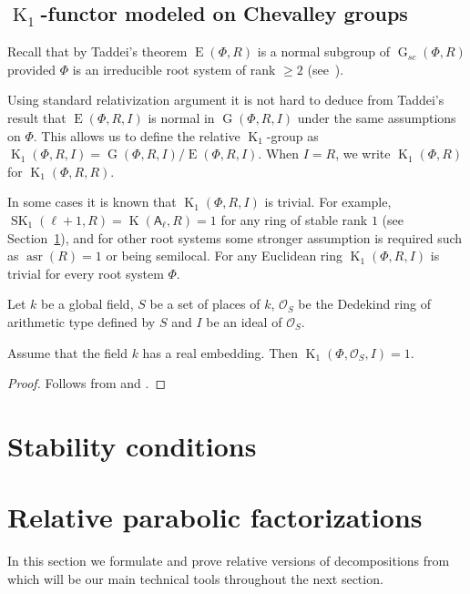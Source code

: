 \documentclass[12pt]{amsart}
\numberwithin{equation}{section}
\theoremstyle{definition}
\DeclareMathOperator{\K}{K}
\DeclareMathOperator{\SK}{SK}
\DeclareMathOperator{\G}{G}
\DeclareMathOperator{\E}{E}
\DeclareMathOperator{\asr}{asr}
\newcommand{\rA}{\mathsf{A}}
\begin{document}
\subsection{$\K_1$-functor modeled on Chevalley groups}

Recall that by Taddei's theorem $\E(\Phi, R)$ is a normal subgroup of $\G_{sc}(\Phi, R)$ provided $\Phi$ is an irreducible root system of rank $\geqslant 2$ (see~\cite{Ta}).

Using standard relativization argument it is not hard to deduce from Taddei's result that $\E(\Phi,R,I)$ is normal in $\G(\Phi,R,I)$ under the same assumptions on $\Phi$.
This allows us to define the relative $\K_1$-group as $\K_1(\Phi,R,I)=\G(\Phi,R,I)/\E(\Phi,R,I).$
When $I=R$, we write $\K_1(\Phi, R)$ for $\K_1(\Phi, R, R)$.

In some cases it is known that $\K_1(\Phi, R, I)$ is trivial.
For example, $\SK_1(\ell+1,R)=\K(\rA_\ell,R)=1$ for any ring of stable rank $1$ (see Section~\ref{sec:stability-conditions}), 
and for other root systems some stronger assumption is required such as $\asr(R)=1$ or being semilocal. 
For any Euclidean ring $\K_1(\Phi, R, I)$ is trivial for every root system $\Phi$.

Let $k$ be a global field, $S$ be a set of places of $k$, 
$\mathcal{O}_S$ be the Dedekind ring of arithmetic type defined by $S$ and $I$ be an ideal of $\mathcal{O}_S$.
\begin{prop} \label{prop:K1triv} Assume that the field $k$ has a real embedding. Then $\K_1(\Phi,\mathcal{O}_S,I)=1$. \end{prop}
\begin{proof} Follows from \cite[Theorem~3.6]{BassMilnorSerre} and \cite[Corollary~4.5]{Ma69}. \end{proof}

\section{Stability conditions}\label{sec:stability-conditions}


\section{Relative parabolic factorizations} \label{sec:factorizations}
In this section we formulate and prove relative versions of decompositions from~\cite{St78} which will be our main technical tools throughout the next section.
\end{document}
